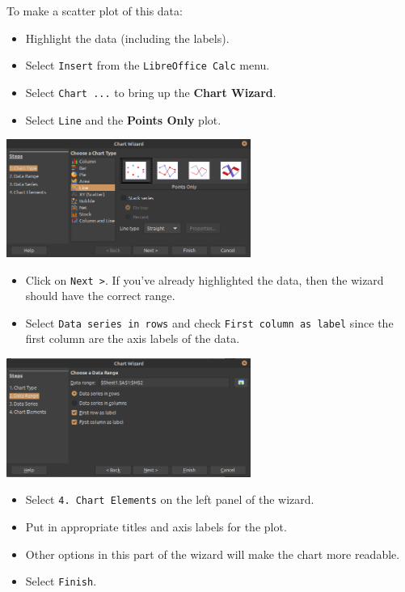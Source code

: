 \noindent To make a scatter plot of this data:
  \begin{itemize}
      \item Highlight the data (including the labels).
      \item Select {\tt Insert} from the {\tt LibreOffice Calc} menu.
      \item Select {\tt Chart ...} to bring up the {\bf Chart Wizard}.
      \item Select {\tt Line} and the {\bf Points Only} plot.
    \end{itemize}
\begin{center}
  \includegraphics[width = 0.6\textwidth]{img/chap1/sec1-3/line-scatter1.png}
\end{center}
  \begin{itemize}
      \item Click on {\tt Next >}. If you've already highlighted the data, then the wizard should have the correct range.
      \item Select {\tt Data series in rows} and check {\tt First column as label} since the first column are the axis labels of the data.
    \end{itemize}
  \begin{center}
  \includegraphics[width = 0.6\textwidth]{img/chap1/sec1-3/scatterplot2.png}
  \end{center}
    \begin{itemize}
      \item Select {\tt 4.\ Chart Elements} on the left panel of the wizard.
      \item Put in appropriate titles and axis labels for the plot.
      \item Other options in this part of the wizard will make the chart more readable.
      \item Select {\tt Finish}.
    \end{itemize}
